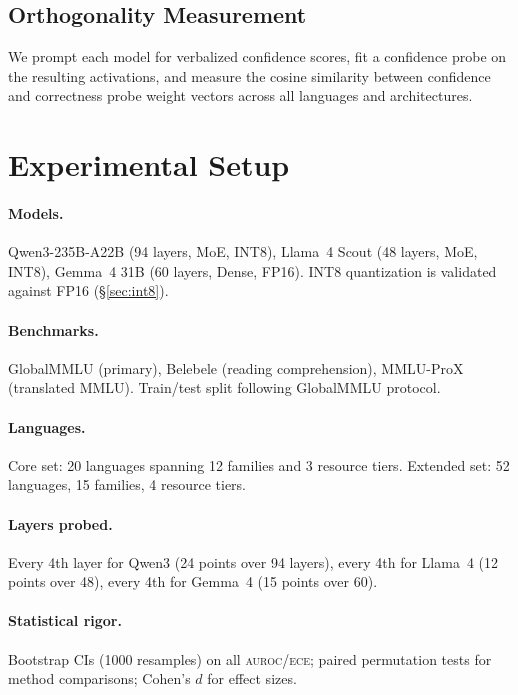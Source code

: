 \documentclass[11pt,a4paper]{article}
\newcommand{\auroc}{\textsc{auroc}}
\newcommand{\ece}{\textsc{ece}}
\begin{document}
\subsection{Orthogonality Measurement}

We prompt each model for verbalized confidence scores, fit a confidence probe on the resulting activations, and measure the cosine similarity between confidence and correctness probe weight vectors across all languages and architectures.

\section{Experimental Setup}
\label{sec:setup}

\paragraph{Models.} Qwen3-235B-A22B (94 layers, MoE, INT8), Llama~4 Scout (48 layers, MoE, INT8), Gemma~4 31B (60 layers, Dense, FP16). INT8 quantization is validated against FP16 (\S\ref{sec:int8}).

\paragraph{Benchmarks.} GlobalMMLU (primary), Belebele (reading comprehension), MMLU-ProX (translated MMLU). Train/test split following GlobalMMLU protocol.

\paragraph{Languages.} Core set: 20 languages spanning 12 families and 3 resource tiers. Extended set: 52 languages, 15 families, 4 resource tiers.

\paragraph{Layers probed.} Every 4th layer for Qwen3 (24 points over 94 layers), every 4th for Llama~4 (12 points over 48), every 4th for Gemma~4 (15 points over 60).

\paragraph{Statistical rigor.} Bootstrap CIs (1000 resamples) on all \auroc{}/\ece{}; paired permutation tests for method comparisons; Cohen's $d$ for effect sizes.
\end{document}
